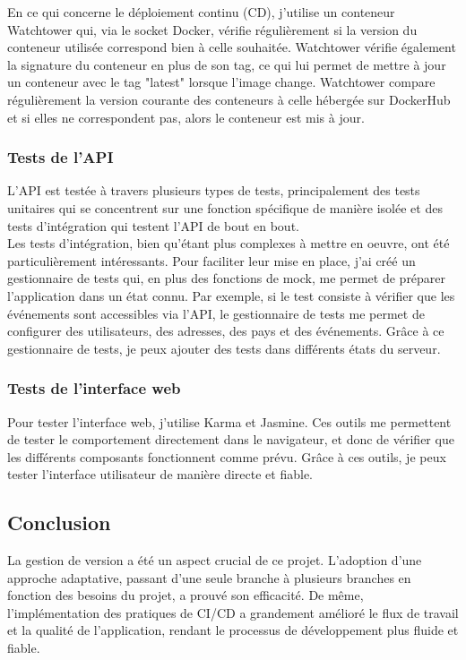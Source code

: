 En ce qui concerne le déploiement continu (CD), j'utilise un conteneur Watchtower qui, via le socket Docker, vérifie régulièrement si la version du conteneur utilisée correspond bien à celle souhaitée.
Watchtower vérifie également la signature du conteneur en plus de son tag, ce qui lui permet de mettre à jour un conteneur avec le tag "latest" lorsque l'image change.
Watchtower compare régulièrement la version courante des conteneurs à celle hébergée sur DockerHub et si elles ne correspondent pas, alors le conteneur est mis à jour.

\subsubsection{Tests de l'API}
L'API est testée à travers plusieurs types de tests, principalement des tests unitaires qui se concentrent sur une fonction
spécifique de manière isolée et des tests d'intégration qui testent l'API de bout en bout.\\

Les tests d'intégration, bien qu'étant plus complexes à mettre en oeuvre, ont été particulièrement intéressants.
Pour faciliter leur mise en place, j'ai créé un gestionnaire de tests qui, en plus des fonctions de mock, me permet de préparer l'application dans un état connu.
Par exemple, si le test consiste à vérifier que les événements sont accessibles via l'API, le gestionnaire de tests me permet de configurer des utilisateurs, des adresses, des pays et des événements.
Grâce à ce gestionnaire de tests, je peux ajouter des tests dans différents états du serveur.

\subsubsection{Tests de l'interface web}
Pour tester l'interface web, j'utilise Karma et Jasmine.
Ces outils me permettent de tester le comportement directement dans le navigateur, et donc de vérifier que les différents composants fonctionnent comme prévu.
Grâce à ces outils, je peux tester l'interface utilisateur de manière directe et fiable.

\subsection{Conclusion}\label{subsec:conclusion}

La gestion de version a été un aspect crucial de ce projet.
L'adoption d'une approche adaptative, passant d'une seule branche à plusieurs branches en fonction des besoins du projet, a prouvé son efficacité.
De même, l'implémentation des pratiques de CI/CD a grandement amélioré le flux de travail et la qualité de l'application, rendant le processus de développement plus fluide et fiable.
